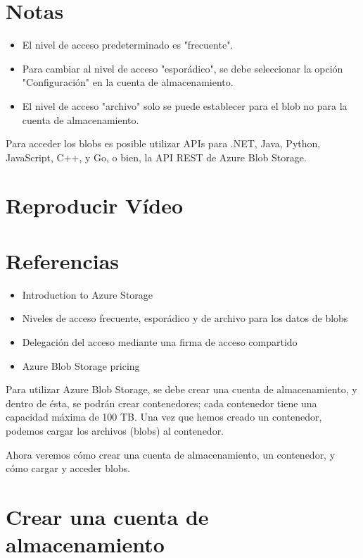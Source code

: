 \section{Notas}

\begin{itemize}
\item El nivel de acceso predeterminado es "frecuente".
\item Para cambiar al nivel de acceso "esporádico", se debe seleccionar la opción "Configuración" en la cuenta de almacenamiento.
\item El nivel de acceso "archivo" solo se puede establecer para el blob no para la cuenta de almacenamiento.
\end{itemize}

Para acceder los blobs es posible utilizar APIs para .NET, Java, Python, JavaScript, C++, y Go, o bien, la API REST de Azure Blob Storage.

\section{Reproducir Vídeo}

\section{Referencias}

\begin{itemize}
\item Introduction to Azure Storage
\item Niveles de acceso frecuente, esporádico y de archivo para los datos de blobs
\item Delegación del acceso mediante una firma de acceso compartido
\item Azure Blob Storage pricing
\end{itemize}

Para utilizar Azure Blob Storage, se debe crear una cuenta de almacenamiento, y dentro de ésta, se podrán crear contenedores; cada contenedor tiene una capacidad máxima de 100 TB. Una vez que hemos creado un contenedor, podemos cargar los archivos (blobs) al contenedor.

Ahora veremos cómo crear una cuenta de almacenamiento, un contenedor, y cómo cargar y acceder blobs.

\section{Crear una cuenta de almacenamiento}

